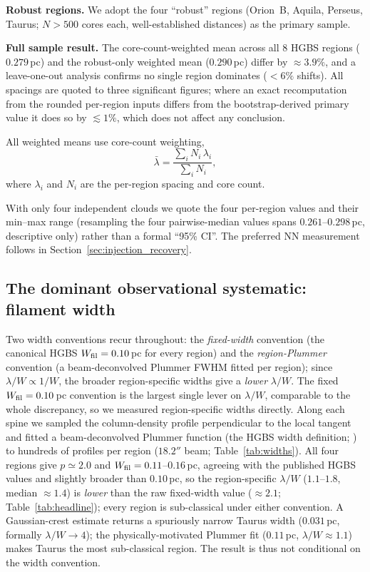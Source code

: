 \documentclass[usenatbib,twoside,twocolumn]{mnras}
\begin{document}
\textbf{Robust regions.} We adopt the four ``robust'' regions (Orion~B, Aquila, Perseus, Taurus; $N>500$ cores each, well-established distances) as the primary sample.

\textbf{Full sample result.} The core-count-weighted mean across all 8 HGBS regions ($0.279$\,pc) and the robust-only weighted mean ($0.290$\,pc) differ by $\approx3.9\%$, and a leave-one-out analysis confirms no single region dominates ($<6\%$ shifts). All spacings are quoted to three significant figures; where an exact recomputation from the rounded per-region inputs differs from the bootstrap-derived primary value it does so by $\lesssim1\%$, which does not affect any conclusion.

All weighted means use core-count weighting,
\begin{equation}
\bar{\lambda} = \frac{\sum_i N_i\,\lambda_i}{\sum_i N_i},
\label{eq:weighting}
\end{equation}
where $\lambda_i$ and $N_i$ are the per-region spacing and core count.

With only four independent clouds we quote the four per-region values and their min--max range (resampling the four pairwise-median values spans $0.261$--$0.298$\,pc, descriptive only) rather than a formal ``95\% CI''. The preferred NN measurement follows in Section~\ref{sec:injection_recovery}.

\subsection{The dominant observational systematic: filament width}
\label{sec:widths}

Two width conventions recur throughout: the \emph{fixed-width} convention (the canonical HGBS $W_{\rm fil}=0.10$\,pc for every region) and the \emph{region-Plummer} convention (a beam-deconvolved Plummer FWHM fitted per region); since $\lambda/W\propto1/W$, the broader region-specific widths give a \emph{lower} $\lambda/W$. The fixed $W_{\rm fil}=0.10$\,pc convention is the largest single lever on $\lambda/W$, comparable to the whole discrepancy, so we measured region-specific widths directly. Along each spine we sampled the column-density profile perpendicular to the local tangent and fitted a beam-deconvolved Plummer function (the HGBS width definition; \citealt{Arzoumanian2019}) to hundreds of profiles per region ($18.2''$ beam; Table~\ref{tab:widths}). All four regions give $p\simeq2.0$ and $W_{\rm fil}=0.11$--$0.16$\,pc, agreeing with the published HGBS values and slightly broader than $0.10$\,pc, so the region-specific $\lambda/W$ ($1.1$--$1.8$, median $\approx1.4$) is \emph{lower} than the raw fixed-width value ($\approx2.1$; Table~\ref{tab:headline}); every region is sub-classical under either convention. A Gaussian-crest estimate returns a spuriously narrow Taurus width ($0.031$\,pc, formally $\lambda/W\to4$); the physically-motivated Plummer fit ($0.11$\,pc, $\lambda/W\approx1.1$) makes Taurus the most sub-classical region. The result is thus not conditional on the width convention.
\end{document}
